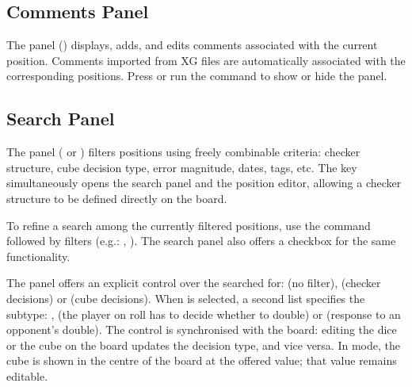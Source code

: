 \documentclass[letterpaper,10pt,english]{sphinxmanual}
\begin{document}
\subsection{Comments Panel}
\label{\detokenize{manuel:panneau-commentaires}}\label{\detokenize{manuel:id4}}
\sphinxAtStartPar
The  panel () displays, adds, and edits comments associated with the current position. Comments imported from XG files are automatically associated with the corresponding positions. Press  or run the  command to show or hide the panel.


\subsection{Search Panel}
\label{\detokenize{manuel:panneau-recherche}}\label{\detokenize{manuel:id5}}
\sphinxAtStartPar
The  panel ( or ) filters positions using freely combinable criteria: checker structure, cube decision type, error magnitude, dates, tags, etc. The  key simultaneously opens the search panel and the position editor, allowing a checker structure to be defined directly on the board.

\sphinxAtStartPar
To refine a search among the currently filtered positions, use the  command followed by filters (e.g.: , ). The search panel also offers a  checkbox for the same functionality.

\sphinxAtStartPar
The panel offers an explicit control over the  searched for:  (no filter),  (checker decisions) or  (cube decisions). When  is selected, a second list specifies the sub\sphinxhyphen{}type: ,  (the player on roll has to decide whether to double) or  (response to an opponent’s double). The control is synchronised with the board: editing the dice or the cube on the board updates the decision type, and vice versa. In  mode, the cube is shown in the centre of the board at the offered value; that value remains editable.
\end{document}
